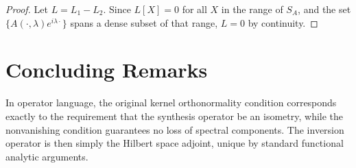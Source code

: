 \documentclass[12pt]{article}
\theoremstyle{plain}
\begin{document}
\begin{proof}
Let $L = L_1 - L_2$. Since $L[X] = 0$ for all $X$ in the range of $S_A$, and the set $\{A(\cdot,\lambda)e^{i\lambda \cdot}\}$ spans a dense subset of that range, $L = 0$ by continuity.
\end{proof}

\section{Concluding Remarks}
In operator language, the original kernel orthonormality condition corresponds exactly to the requirement that the synthesis operator be an isometry, while the nonvanishing condition guarantees no loss of spectral components. The inversion operator is then simply the Hilbert space adjoint, unique by standard functional analytic arguments.
\end{document}
